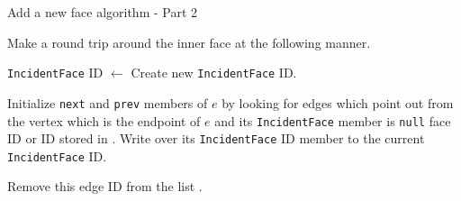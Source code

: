 	\begin{algorithm}[h]
	\caption{Add a new face algorithm - Part 2}
	\begin{algorithmic}[1]
			\Statex

				\State Make a round trip around the inner face at the following
					manner.
				\Statex

					\State \texttt{IncidentFace} ID $\gets$ \vara
				\Else
					\State Create new \texttt{IncidentFace} ID.
				\EndIf
				
				\Statex

				\State Initialize \texttt{next} and \texttt{prev} members of $e$
					by looking for edges which
				\Statex[2]	point out from the vertex which is the endpoint of
					$e$ and its
				\Statex[2]	\texttt{Inci\-dent\-Face} member is \texttt{null}
					face ID or ID stored in \vara.
				\Statex[2]	Write over its \texttt{IncidentFace} ID member to
					the current
				\Statex[2]	\texttt{IncidentFace} ID.
				\Statex

						\State Remove this edge ID from the list \lste.
					\EndIf
				\EndFor
			\EndFor
			\Statex


		\EndFunction
	\end{algorithmic}
	\end{algorithm}

	
	






